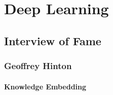 \chapter{Deep Learning}

\section{Interview of Fame}

\subsection{Geoffrey Hinton}
\subsubsection{Knowledge Embedding}
